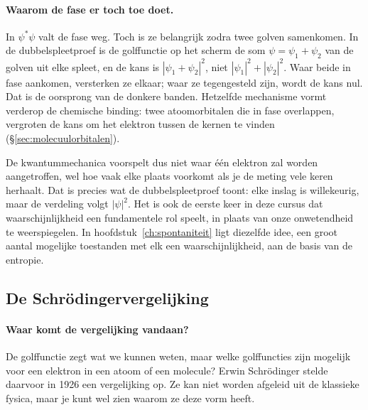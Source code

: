 \paragraph{Waarom de fase er toch toe doet.}
In $\psi^*\psi$ valt de fase weg. Toch is ze belangrijk zodra twee golven samenkomen. In de dubbelspleetproef is de golffunctie op het scherm de som $\psi = \psi_1 + \psi_2$ van de golven uit elke spleet, en de kans is $|\psi_1 + \psi_2|^2$, niet $|\psi_1|^2 + |\psi_2|^2$. Waar beide in fase aankomen, versterken ze elkaar; waar ze tegengesteld zijn, wordt de kans nul. Dat is de oorsprong van de donkere banden. Hetzelfde mechanisme vormt verderop de chemische binding: twee atoomorbitalen die in fase overlappen, vergroten de kans om het elektron tussen de kernen te vinden (\S\ref{sec:molecuulorbitalen}).

De kwantummechanica voorspelt dus niet waar één elektron zal worden aangetroffen, wel hoe vaak elke plaats voorkomt als je de meting vele keren herhaalt. Dat is precies wat de dubbelspleetproef toont: elke inslag is willekeurig, maar de verdeling volgt $|\psi|^2$. Het is ook de eerste keer in deze cursus dat waarschijnlijkheid een fundamentele rol speelt, in plaats van onze onwetendheid te weerspiegelen. In hoofdstuk~\ref{ch:spontaniteit} ligt diezelfde idee, een groot aantal mogelijke toestanden met elk een waarschijnlijkheid, aan de basis van de entropie.

\subsection{De Schr\"odingervergelijking}

\paragraph{Waar komt de vergelijking vandaan?}
De golffunctie zegt wat we kunnen weten, maar welke golffuncties zijn mogelijk voor een elektron in een atoom of een molecule? Erwin Schr\"odinger stelde daarvoor in 1926 een vergelijking op. Ze kan niet worden afgeleid uit de klassieke fysica, maar je kunt wel zien waarom ze deze vorm heeft.

